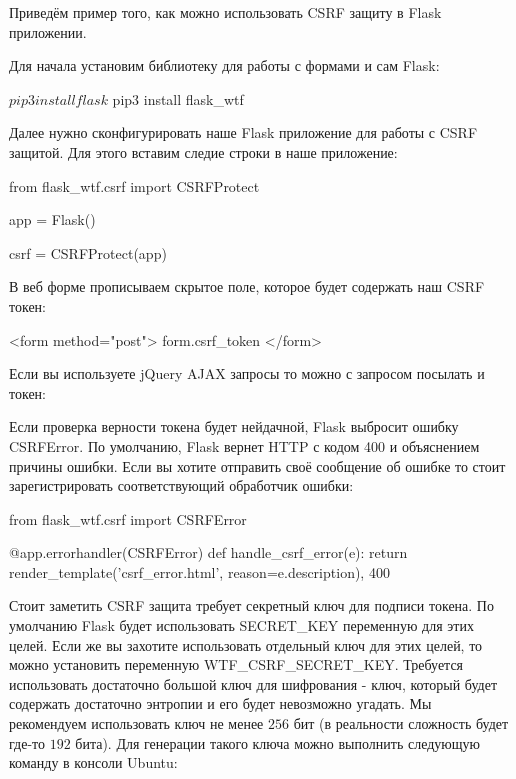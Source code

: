 Приведём пример того, как можно использовать CSRF защиту в Flask 
приложении.

Для начала установим библиотеку для работы с формами и сам Flask:

\begin{python}
$ pip3 install flask
$ pip3 install flask_wtf
\end{python}

Далее нужно сконфигурировать наше Flask приложение для работы с CSRF
защитой. Для этого вставим следие строки в наше приложение:

\begin{python}
from flask_wtf.csrf import CSRFProtect

app = Flask()

csrf = CSRFProtect(app)
\end{python}

В веб форме прописываем скрытое поле, которое будет содержать наш CSRF токен:

\begin{python}
<form method="post">
    {{ form.csrf_token }}
</form>
\end{python}

Если вы используете jQuery AJAX запросы то можно с запросом посылать и
токен:


Если проверка верности токена будет нейдачной, Flask выбросит ошибку CSRFError. 
По умолчанию, Flask вернет HTTP с кодом 400 и объяснением причины ошибки. Если
вы хотите отправить своё сообщение об ошибке то стоит зарегистрировать соответствующий
обработчик ошибки:

\begin{python}
from flask_wtf.csrf import CSRFError

@app.errorhandler(CSRFError)
def handle_csrf_error(e):
    return render_template('csrf_error.html', reason=e.description), 400
\end{python}

Стоит заметить CSRF защита требует секретный ключ для подписи токена. По умолчанию Flask 
будет использовать SECRET\_KEY переменную для этих целей. Если же вы захотите использовать
отдельный ключ для этих целей, то можно установить переменную WTF\_CSRF\_SECRET\_KEY.
Требуется использовать достаточно большой ключ для шифрования - ключ, который будет
содержать достаточно энтропии и его будет невозможно угадать. Мы рекомендуем использовать
ключ не менее $256$ бит (в реальности сложность будет где-то $192$ бита). Для генерации 
такого ключа можно выполнить следующую команду в консоли Ubuntu:

